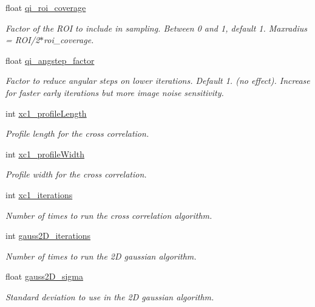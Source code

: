 \begin{DoxyCompactItemize}
float \hyperlink{struct_q_trk_settings_ab9567d21cc1517713a746c2173de4264}{qi\+\_\+roi\+\_\+coverage}
\begin{DoxyCompactList}\small\item\em Factor of the R\+OI to include in sampling. Between 0 and 1, default 1. Maxradius = R\+O\+I/2$\ast$roi\+\_\+coverage. \end{DoxyCompactList}\item 
float \hyperlink{struct_q_trk_settings_aceebf67ba9ecc215d49c6b2739afae3d}{qi\+\_\+angstep\+\_\+factor}
\begin{DoxyCompactList}\small\item\em Factor to reduce angular steps on lower iterations. Default 1. (no effect). Increase for faster early iterations but more image noise sensitivity. \end{DoxyCompactList}\item 
int \hyperlink{struct_q_trk_settings_a8f38457c4ec183f78a0191b247ab6b51}{xc1\+\_\+profile\+Length}
\begin{DoxyCompactList}\small\item\em Profile length for the cross correlation. \end{DoxyCompactList}\item 
int \hyperlink{struct_q_trk_settings_a80de240523eb79408593d26e6ef07ef7}{xc1\+\_\+profile\+Width}
\begin{DoxyCompactList}\small\item\em Profile width for the cross correlation. \end{DoxyCompactList}\item 
int \hyperlink{struct_q_trk_settings_a0bc4efdffbb8ad272d1c9facfdf0e171}{xc1\+\_\+iterations}
\begin{DoxyCompactList}\small\item\em Number of times to run the cross correlation algorithm. \end{DoxyCompactList}\item 
int \hyperlink{struct_q_trk_settings_aa5ae2b9e5700fe2eab58f9084389c3ad}{gauss2\+D\+\_\+iterations}
\begin{DoxyCompactList}\small\item\em Number of times to run the 2D gaussian algorithm. \end{DoxyCompactList}\item 
float \hyperlink{struct_q_trk_settings_a950fc67c972c608570ef2dd27fcfaf4d}{gauss2\+D\+\_\+sigma}
\begin{DoxyCompactList}\small\item\em Standard deviation to use in the 2D gaussian algorithm. \end{DoxyCompactList}\item 

\end{DoxyCompactItemize}
